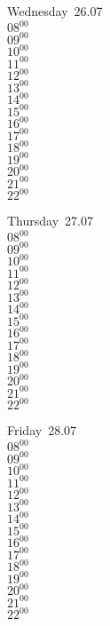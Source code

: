 \documentclass[11pt,a4paper]{book}\usepackage[]{graphicx}\usepackage[]{color}
\begin{document}
\begin{weekdaybox}
  Wednesday~26.07\\
  { 
  \vfill
  $08^{00}$\\
$09^{00}$\\
$10^{00}$\\
$11^{00}$\\
$12^{00}$\\
$13^{00}$\\
$14^{00}$\\
$15^{00}$\\
$16^{00}$\\
$17^{00}$\\
$18^{00}$\\
$19^{00}$\\
$20^{00}$\\
$21^{00}$\\
$22^{00}$\\
  }
\end{weekdaybox}
\clearpage
\begin{headerbox}
\end{headerbox}
\begin{weekdaybox}
  Thursday~27.07\\
  { 
  \vfill
  $08^{00}$\\
$09^{00}$\\
$10^{00}$\\
$11^{00}$\\
$12^{00}$\\
$13^{00}$\\
$14^{00}$\\
$15^{00}$\\
$16^{00}$\\
$17^{00}$\\
$18^{00}$\\
$19^{00}$\\
$20^{00}$\\
$21^{00}$\\
$22^{00}$\\
  }
\end{weekdaybox} 
\begin{weekdaybox}
  Friday~28.07\\
  { 
  \vfill
  $08^{00}$\\
$09^{00}$\\
$10^{00}$\\
$11^{00}$\\
$12^{00}$\\
$13^{00}$\\
$14^{00}$\\
$15^{00}$\\
$16^{00}$\\
$17^{00}$\\
$18^{00}$\\
$19^{00}$\\
$20^{00}$\\
$21^{00}$\\
$22^{00}$\\
  }
\end{weekdaybox}
\end{document}
